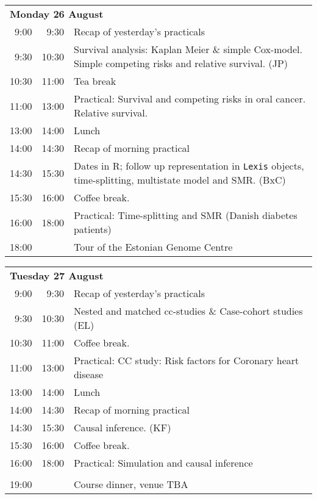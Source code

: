 \noindent
\begin{tabular}{r@{ -- }rp{13cm}}
\multicolumn{3}{l}{\bf Monday 26 August} \\
 9:00 &  9:30 & Recap of yesterday's practicals \\
 9:30 & 10:30 & Survival analysis: Kaplan Meier \& simple
                Cox-model. Simple competing risks and relative
                survival. (JP)\\
10:30 & 11:00 & Tea break\\
11:00 & 13:00 & Practical: Survival and competing risks in oral \newline
                           cancer. Relative survival.\\
13:00 & 14:00 & Lunch \\
14:00 & 14:30 & Recap of morning practical \\
14:30 & 15:30 & Dates in R; follow up representation in \texttt{Lexis} objects,
                time-splitting, multistate model and SMR. (BxC)\\
15:30 & 16:00 & Coffee break. \\
16:00 & 18:00 & Practical: Time-splitting and SMR (Danish diabetes
                patients)\\
18:00 &       & Tour of the Estonian Genome Centre\\[1em]
\end{tabular}

\noindent
\begin{tabular}{r@{ -- }rp{13cm}}
\multicolumn{3}{l}{\bf Tuesday 27 August} \\
 9:00 &  9:30 & Recap of yesterday's practicals \\
 9:30 & 10:30 & Nested and matched cc-studies \& Case-cohort studies (EL) \\
10:30 & 11:00 & Coffee break. \\
11:00 & 13:00 & Practical: CC study: Risk factors for Coronary heart disease\\
13:00 & 14:00 & Lunch \\
14:00 & 14:30 & Recap of morning practical \\
14:30 & 15:30 & Causal inference. (KF)\\
15:30 & 16:00 & Coffee break. \\
16:00 & 18:00 & Practical: Simulation and causal inference\\
      &       & \\
19:00 &       & Course dinner, venue TBA\\[1em]
\end{tabular}

